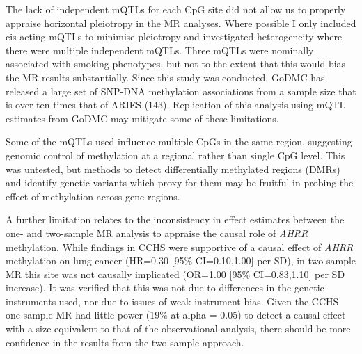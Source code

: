\documentclass[11pt,oneside]{bristolthesis}
\begin{document}
The lack of independent mQTLs for each CpG site did not allow us to properly appraise horizontal pleiotropy in the MR analyses. Where possible I only included cis-acting mQTLs to minimise pleiotropy and investigated heterogeneity where there were multiple independent mQTLs. Three mQTLs were nominally associated with smoking phenotypes, but not to the extent that this would bias the MR results substantially. Since this study was conducted, GoDMC has released a large set of SNP-DNA methylation associations from a sample size that is over ten times that of ARIES (143). Replication of this analysis using mQTL estimates from GoDMC may mitigate some of these limitations.

Some of the mQTLs used influence multiple CpGs in the same region, suggesting genomic control of methylation at a regional rather than single CpG level. This was untested, but methods to detect differentially methylated regions (DMRs) and identify genetic variants which proxy for them may be fruitful in probing the effect of methylation across gene regions.

A further limitation relates to the inconsistency in effect estimates between the one- and two-sample MR analysis to appraise the causal role of \emph{AHRR} methylation. While findings in CCHS were supportive of a causal effect of \emph{AHRR} methylation on lung cancer (HR=0.30 {[}95\% CI=0.10,1.00{]} per SD), in two-sample MR this site was not causally implicated (OR=1.00 {[}95\% CI=0.83,1.10{]} per SD increase). It was verified that this was not due to differences in the genetic instruments used, nor due to issues of weak instrument bias. Given the CCHS one-sample MR had little power (19\% at alpha = 0.05) to detect a causal effect with a size equivalent to that of the observational analysis, there should be more confidence in the results from the two-sample approach.
\end{document}
